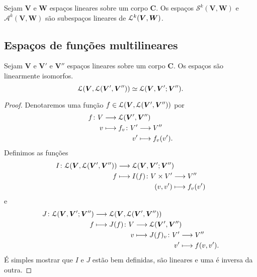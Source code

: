 \begin{proposition}
Sejam $\bm V$ e $\bm W$ espaços lineares sobre um corpo $\bm C$. Os espaços $\mathcal S^k(\bm V,\bm W)$ e $\mathcal A^k(\bm V,\bm W)$ são subespaços lineares de $\mathcal{L}^k(\bm V,\bm W)$.
\end{proposition}


\subsection{Espaços de funções multilineares}

\begin{proposition}
\label{prop:isomorfismo.espacolinear.espacobilinear}
Sejam $\bm V$ e $\bm V'$ e $\bm V''$ espaços lineares sobre um corpo $\bm C$. Os espaços são linearmente isomorfos.
	\begin{equation*}
	\mathcal{L}(\bm V,\mathcal{L}(\bm V',\bm V'')) \simeq \mathcal{L}(\bm V,\bm V';\bm V'').
	\end{equation*}
\end{proposition}
\begin{proof}
Denotaremos uma função $f \in \mathcal{L}(\bm V,\mathcal{L}(\bm V',\bm V''))$ por
	\begin{align*}
	\func{f}{V}{\lin(\bm V',\bm V'')}{v}{
		\begin{aligned}[t]
		\func{f_v}{V'}{V''}{v'}{f_v(v')}.
		\end{aligned}
	}
	\end{align*}
Definimos as funções
	\begin{align*}
	\func{I}{\lin(\bm V,\lin(\bm V',\bm V''))}{\lin(\bm V,\bm V';\bm V'')}{f}{
		\begin{aligned}[t]
		\func{I(f)}{V \times V'}{V''}{(v,v')}{f_v(v')}
		\end{aligned}
	}
	\end{align*}
e
	\begin{align*}
	\func{J}{\lin(\bm V,\bm V';\bm V'')}{\lin(\bm V,\lin(\bm V',\bm V''))}{f}{
		\begin{aligned}[t]
		\func{J(f)}{V}{\lin(\bm V',\bm V'')}{v}{
			\begin{aligned}[t]
			\func{J(f)_v}{V'}{V''}{v'}{f(v,v')}.
			\end{aligned}
		}
		\end{aligned}
	}
	\end{align*}
É simples mostrar que $I$ e $J$ estão bem definidas, são lineares e uma é inversa da outra.
\end{proof}




